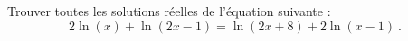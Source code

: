 	Trouver toutes les solutions réelles de l'équation suivante :
	\[
		2 \ln (x) +\ln(2x-1) = \ln(2x+8) + 2\ln(x-1) \ .
	\]